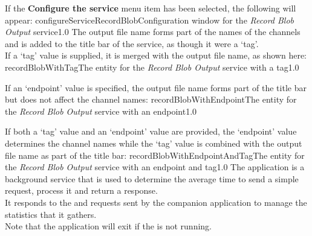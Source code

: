 If the \textbf{Configure the service} menu item has been selected, the following will
appear:
%
{configureServiceRecordBlob}{Configuration window for the \emph{Record Blob Output}
service}{1.0}
\condPage{}
The output file name forms part of the names of the channels and is added to the title bar
of the service, as though it were a `tag'.\\

If a `tag' value is supplied, it is merged with the output file name, as shown here:
%
{recordBlobWithTag}{The \emph{\MMMU} entity for the \emph{Record Blob Output} service with
a tag}{1.0}

If an `endpoint' value is specified, the output file name forms part of the title bar but
does not affect the channel names:
%
{recordBlobWithEndpoint}{The \emph{\MMMU} entity for the \emph{Record Blob Output} service
with an endpoint}{1.0}

If both a `tag' value and an `endpoint' value are provided, the `endpoint' value
determines the channel names while the `tag' value is combined with the output file name
as part of the title bar:
%
{recordBlobWithEndpointAndTag}{The \emph{\MMMU} entity for the \emph{Record Blob Output}
service with an endpoint and tag}{1.0}
\condPage
{}
The  application is a background service that is
used to determine the average time to send a simple request, process it and return a
response.\\

It responds to the  and
 requests sent by the
companion application  to manage the statistics
that it gathers.\\

Note that the application will exit if the  is not
running.\\

